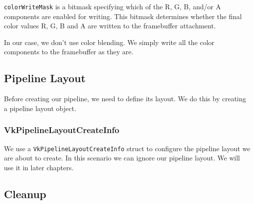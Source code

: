 \texttt{colorWriteMask} is a bitmask specifying which of the R, G, B, and/or A
components are enabled for writing.
This bitmask determines whether the final color values R, G, B and A are written
to the framebuffer attachment.

In our case, we don't use color blending.
We simply write all the color components to the framebuffer as they are.

\begin{minipage}{\linewidth}{\noindent}
    
\end{minipage}

\subsection{Pipeline Layout}

Before creating our pipeline, we need to define its layout.
We do this by creating a pipeline layout object.

\begin{minipage}{\linewidth}{\noindent}
    
\end{minipage}

\subsubsection{VkPipelineLayoutCreateInfo}

We use a \texttt{VkPipelineLayoutCreateInfo} struct to configure the pipeline
layout we are about to create.
In this scenario we can ignore our pipeline layout.
We will use it in later chapters.

\begin{minipage}{\linewidth}{\noindent}
    
\end{minipage}

\subsection{Cleanup}

